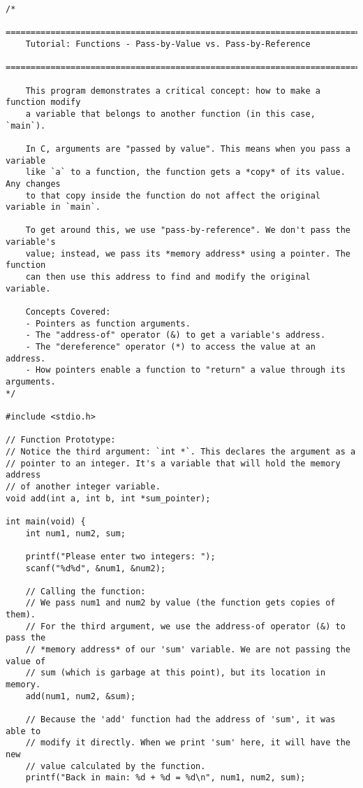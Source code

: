 \documentclass[11pt]{book}
\begin{document}
\begin{verbatim}
/*
    ================================================================================
    Tutorial: Functions - Pass-by-Value vs. Pass-by-Reference
    ================================================================================

    This program demonstrates a critical concept: how to make a function modify
    a variable that belongs to another function (in this case, `main`).

    In C, arguments are "passed by value". This means when you pass a variable
    like `a` to a function, the function gets a *copy* of its value. Any changes
    to that copy inside the function do not affect the original variable in `main`.

    To get around this, we use "pass-by-reference". We don't pass the variable's
    value; instead, we pass its *memory address* using a pointer. The function
    can then use this address to find and modify the original variable.

    Concepts Covered:
    - Pointers as function arguments.
    - The "address-of" operator (&) to get a variable's address.
    - The "dereference" operator (*) to access the value at an address.
    - How pointers enable a function to "return" a value through its arguments.
*/

#include <stdio.h>

// Function Prototype:
// Notice the third argument: `int *`. This declares the argument as a
// pointer to an integer. It's a variable that will hold the memory address
// of another integer variable.
void add(int a, int b, int *sum_pointer);

int main(void) {
    int num1, num2, sum;

    printf("Please enter two integers: ");
    scanf("%d%d", &num1, &num2);

    // Calling the function:
    // We pass num1 and num2 by value (the function gets copies of them).
    // For the third argument, we use the address-of operator (&) to pass the
    // *memory address* of our 'sum' variable. We are not passing the value of
    // sum (which is garbage at this point), but its location in memory.
    add(num1, num2, &sum);

    // Because the 'add' function had the address of 'sum', it was able to
    // modify it directly. When we print 'sum' here, it will have the new
    // value calculated by the function.
    printf("Back in main: %d + %d = %d\n", num1, num2, sum);


\end{verbatim}
\end{document}
